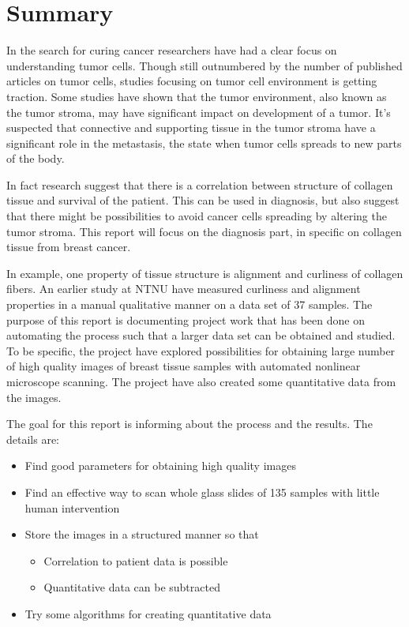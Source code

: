 \chapter{Summary}

In the search for curing cancer researchers have had a clear focus on understanding tumor cells. Though still outnumbered by the number of published articles on tumor cells, studies focusing on tumor cell environment is getting traction. Some studies have shown that the tumor environment, also known as the tumor stroma, may have significant impact on development of a tumor. It's suspected that connective and supporting tissue in the tumor stroma have a significant role in the metastasis, the state when tumor cells spreads to new parts of the body.

In fact research suggest that there is a correlation between structure of collagen tissue and survival of the patient. This can be used in diagnosis, but also suggest that there might be possibilities to avoid cancer cells spreading by altering the tumor stroma. This report will focus on the diagnosis part, in specific on collagen tissue from breast cancer.

In example, one property of tissue structure is alignment and curliness of collagen fibers. An earlier study at NTNU have measured curliness and alignment properties in a manual qualitative manner on a data set of 37 samples. The purpose of this report is documenting project work that has been done on automating the process such that a larger data set can be obtained and studied. To be specific, the project have explored possibilities for obtaining large number of high quality images of breast tissue samples with automated nonlinear microscope scanning. The project have also created some quantitative data from the images.

The goal for this report is informing about the process and the results. The details are:
\begin{itemize}
\item Find good parameters for obtaining high quality images
\item Find an effective way to scan whole glass slides of 135 samples with little human intervention
\item Store the images in a structured manner so that 
    \begin{itemize}
    \item Correlation to patient data is possible
    \item Quantitative data can be subtracted
    \end{itemize}
\item Try some algorithms for creating quantitative data
\end{itemize}

